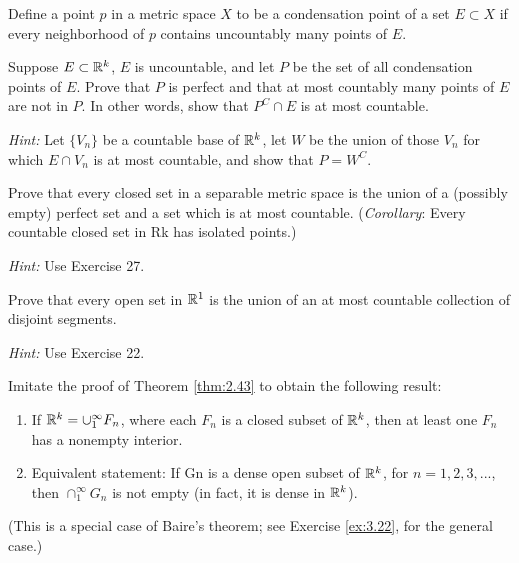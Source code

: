 \begin{myExercise}
    \label{ex:2.27}
    Define a point $p$ in a metric space $X$ to be a condensation point of a set $E \subset X$ if every neighborhood of $p$ contains uncountably many points of $E$. 
    
    Suppose $E \subset {\protect\mathbb R}^k$, $E$ is uncountable, 
    and let $P$ be the set of all condensation points of $E$.
    Prove that $P$ is perfect and that 
    at most countably many points of $E$ are not in $P$. 
    In other words, show that $P^C \cap E$ is at most countable. 
    
    \emph{Hint:} Let $\{V_n\}$ be a countable base of ${\protect\mathbb R}^k$, 
    let $W$ be the union of those $V_n$ for which $E \cap V_n$
    is at most countable, and show that $P = W^C$.
\end{myExercise}

\begin{myExercise}
    \label{ex:2.28}
    Prove that every closed set in a separable metric space is the union of a (possibly empty) perfect set and a set which is at most countable. 
    (\emph{Corollary}: Every countable closed set in Rk has isolated points.) 
    
    \emph{Hint:} Use Exercise 27.
\end{myExercise}


\begin{myExercise}
    \label{ex:2.29}
    Prove that every open set in ${\protect\mathbb R}^1$ is the union of an at most countable collection of disjoint segments. 

    \emph{Hint:} Use Exercise 22.
\end{myExercise}

\begin{myExercise}
    \label{ex:2.30}
    Imitate the proof of Theorem \ref{thm:2.43} to obtain the following result:
    \begin{enumerate}
        \item If ${\protect\mathbb R}^k = \cup_1^{\infty} F_n$, where each $F_n$ is a closed subset of ${\protect\mathbb R}^k$, then at least one $F_n$ has a nonempty interior. 
        \item Equivalent statement: If Gn is a dense open subset of ${\protect\mathbb R}^k$, for $n = 1, 2, 3, ... $, then $\cap_1^{\infty} G_n$ is not empty (in fact, it is dense in ${\protect\mathbb R}^k$).
    \end{enumerate}
    (This is a special case of Baire's theorem; see Exercise \ref{ex:3.22}, for the general case.)
\end{myExercise}